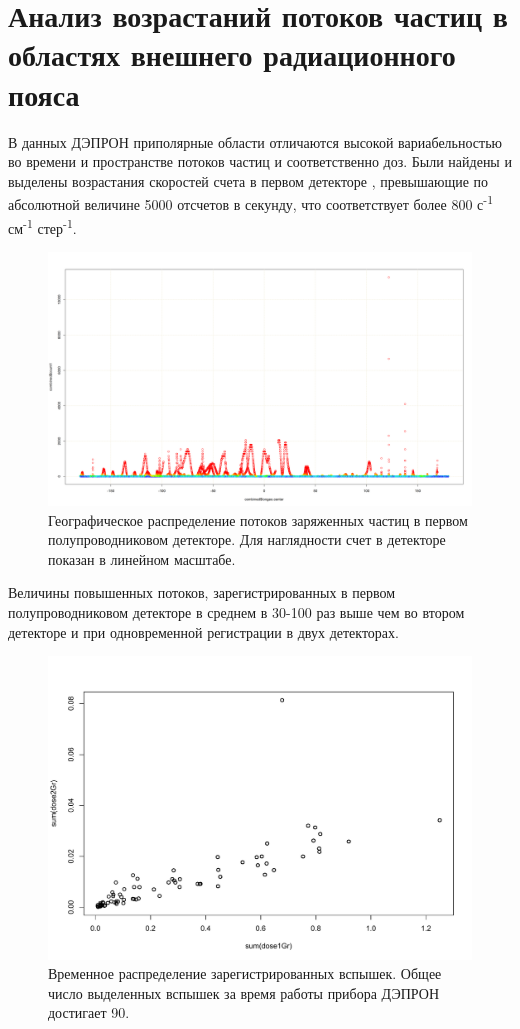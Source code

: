 \section{Анализ возрастаний потоков частиц в областях внешнего радиационного пояса}\label{sec:flash_analisys}
В  данных  ДЭПРОН приполярные области отличаются высокой вариабельностью во времени и пространстве потоков частиц и соответственно доз. Были найдены и выделены возрастания скоростей счета в первом детекторе	\label{fig:depronlatmap148}, превышающие по абсолютной величине 5000 отсчетов в секунду, что соответствует более 800 с\textsuperscript{-1} см\textsuperscript{-1} стер\textsuperscript{-1}. 
\begin{figure}[h]
	\centering
	\includegraphics[width=0.8\linewidth]{images/Flash/depron_lat_map_148}
	\caption{Географическое распределение потоков заряженных частиц в первом полупроводниковом детекторе. Для наглядности счет в детекторе показан в линейном масштабе.}
	\label{fig:depronlatmap148}
\end{figure}
Величины повышенных потоков, зарегистрированных в первом полупроводниковом детекторе в среднем в 30-100 раз выше чем во втором детекторе и при одновременной регистрации в двух детекторах.
\begin{figure}[h]
	\centering
	\includegraphics[width=0.7\linewidth]{images/Flash/Rplot03}
	\caption{Временное распределение зарегистрированных вспышек. Общее число выделенных вспышек за время работы прибора ДЭПРОН достигает 90.}
	\label{fig:rplot03}
\end{figure}

